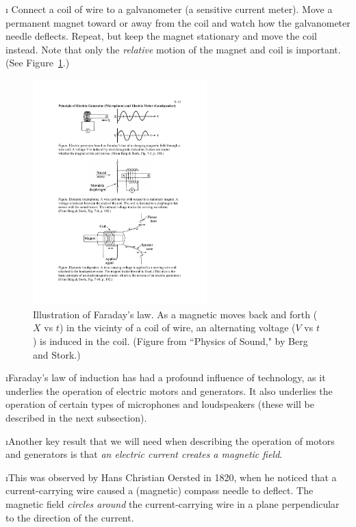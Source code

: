\i \demo
Connect a coil of wire to a galvanometer (a sensitive current meter).
Move a permanent magnet toward or away from the coil and watch how the
galvanometer needle deflects.
Repeat, but keep the magnet stationary and move the coil instead.
Note that only the {\em relative} motion of the magnet and coil is important.
(See Figure~\ref{f:faraday}.)
%
\begin{figure}[htbp]
\begin{center}
\includegraphics[width=0.6\textwidth]{faraday}
\caption{Illustration of Faraday's law.
As a magnetic moves back and forth ($X$ vs $t$) in the vicinty 
of a coil of wire, an alternating voltage ($V$ vs $t$) is induced
in the coil.
(Figure from ``Physics of Sound," by Berg and Stork.)} 
\label{f:faraday}
\end{center}
\end{figure}
%
 
\i Faraday's law of induction has had a profound influence of 
technology, as it underlies the operation of electric motors and generators.
It also underlies the operation of certain types of microphones and
loudspeakers (these will be described in the next subsection).

\i Another key result that we will need when describing the 
operation of motors and generators is that 
{\em an electric current creates a magnetic field}.

\i This was observed by Hans Christian Oersted in 1820, when he noticed
that a current-carrying wire caused a (magnetic) compass needle to deflect.
The magnetic field {\em circles around} the current-carrying wire 
in a plane perpendicular to the direction of the current.

